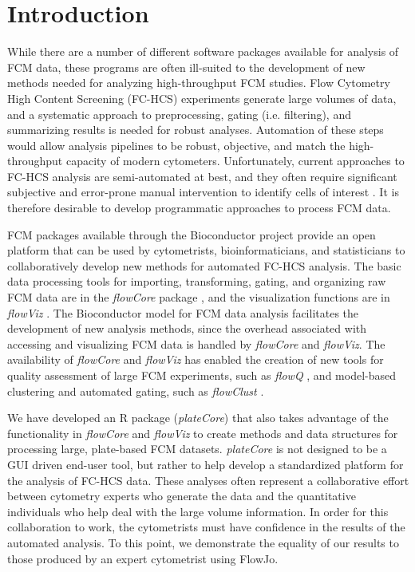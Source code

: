 \documentclass[12pt]{article}
\newcommand{\Rpackage}[1]{{\textit{#1}}}
\begin{document}
\clearpage
\section*{Introduction}

While there are a number of different software packages available for analysis
of FCM data, these programs are often ill-suited to the development of new
methods needed for analyzing high-throughput FCM studies. Flow Cytometry High
Content Screening (FC-HCS) experiments generate large volumes of data, and a
systematic approach to preprocessing, gating (i.e. filtering), and summarizing
results is needed for robust analyses. Automation of these steps would allow
analysis pipelines to be robust, objective, and match the high-throughput
capacity of modern cytometers. Unfortunately, current approaches to FC-HCS
analysis are semi-automated at best, and they often require significant
subjective and error-prone manual intervention to identify cells of interest
\citep{Maecker2005}. It is therefore desirable to develop programmatic
approaches to process FCM data.

FCM packages available through the Bioconductor \citep{BIOC} project provide an
open platform that can be used by cytometrists, bioinformaticians, and
statisticians to collaboratively develop new methods for automated FC-HCS
analysis. The basic data processing tools for importing, transforming, gating,
and organizing raw FCM data are in the \Rpackage{flowCore} package
\citep{hahne2009}, and the visualization functions are in \Rpackage{flowViz}
\citep{sarkar2008ufv}. The Bioconductor model for FCM data analysis facilitates
the development of new analysis methods, since the overhead associated with
accessing and visualizing FCM data is handled by \Rpackage{flowCore} and
\Rpackage{flowViz}. The availability of \Rpackage{flowCore} and
\Rpackage{flowViz} has enabled the creation of new tools for quality assessment
of large FCM experiments, such as \Rpackage{flowQ} \citep{lemeurFQ}, and
model-based clustering and automated gating, such as \Rpackage{flowClust}
\citep{lo2008}.

We have developed an R package (\Rpackage{plateCore}) that also takes advantage
of the functionality in \Rpackage{flowCore} and \Rpackage{flowViz} to create
methods and data structures for processing large, plate-based FCM datasets.
\Rpackage{plateCore} is not designed to be a GUI driven end-user tool, but
rather to help develop a standardized platform for the analysis of FC-HCS data.
These analyses often represent a collaborative effort between cytometry experts
who generate the data and the quantitative individuals who help deal with the
large volume information. In order for this collaboration to work, the
cytometrists must have confidence in the results of the automated analysis. To
this point, we demonstrate the equality of our results to those produced by an
expert cytometrist using FlowJo.
\end{document}
